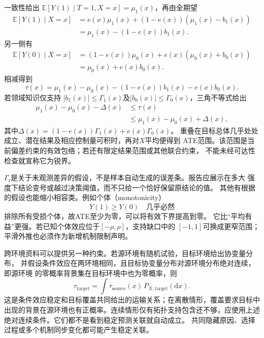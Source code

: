 一致性给出
\(\mathbb E[Y(1)\mid T=1,X=x]=\mu_1(x)\)，再由全期望
\[
  \begin{aligned}
    \mathbb E[Y(1)\mid X=x]
    &=e(x)\mu_1(x)+(1-e(x))(\mu_1(x)-b_1(x))\\
    &=\mu_1(x)-(1-e(x))b_1(x).
  \end{aligned}
\]
另一侧有
\[
  \begin{aligned}
    \mathbb E[Y(0)\mid X=x]
    &=(1-e(x))\mu_0(x)+e(x)(\mu_0(x)+b_0(x))\\
    &=\mu_0(x)+e(x)b_0(x).
  \end{aligned}
\]
相减得到
\begin{equation}
  \tau(x)=\mu_1(x)-\mu_0(x)
  -(1-e(x))b_1(x)-e(x)b_0(x).
  \label{eq:causal-selection-bias-function}
\end{equation}
若领域知识仅支持
\(|b_1(x)|\leq\Gamma_1(x)\)及\(|b_0(x)|\leq\Gamma_0(x)\)，三角不等式给出
\begin{equation}
  \begin{aligned}
    \mu_1(x)-\mu_0(x)-\Delta(x)
    &\leq\tau(x)\\
    &\leq\mu_1(x)-\mu_0(x)+\Delta(x),
  \end{aligned}
  \label{eq:causal-sensitivity-bounds}
\end{equation}
其中\(\Delta(x)=(1-e(x))\Gamma_1(x)+e(x)\Gamma_0(x)\)。
重叠在目标总体几乎处处成立、潜在结果及相应控制量可积时，再对\(X\)平均便得到
ATE范围。该范围是当前偏差约束的有效包络；若还有限定结果范围或其他联合约束，
不能未经可达性检查就宣称它为锐界。

\(\Gamma_t\)是关于未观测差异的假设，不是样本自动生成的误差条。报告应展示在多大
强度下结论变号或越过决策阈值，而不只给一个恰好保留原结论的值。
其他有根据的假设也能缩小相容类。例如个体（monotonicity）
\[
  Y(1)\geq Y(0)\quad\text{几乎必然}
\]
排除所有受损个体，故ATE至少为零，可以将有效下界提高到零。
它比“平均有益”更强。若已知个体效应位于\([-\rho,\rho]\)，支持缺口中的
\([-1,1]\)可换成更窄范围；平滑外推也必须作为新增机制限制声明。

跨环境资料可以提供另一种约束。若源环境有随机试验，目标环境给出协变量分布，
并假设条件效应在两环境相同，且目标协变量分布对源环境分布绝对连续，即源环境
的零概率背景集在目标环境中也为零概率，则
\[
  \tau_{\mathrm{target}}
  =\int\tau_{\mathrm{source}}(x)\,P_{X,\mathrm{target}}(\mathrm dx).
\]
这是条件效应稳定和目标覆盖共同给出的运输关系；在离散情形，覆盖要求目标中
出现的背景在源环境也有正概率。连续情形仅有拓扑支持包含还不够，应使用上述
绝对连续条件。它们都不是看到稳定预测关联就自动成立。
共同隐藏原因、选择过程或多个机制同步变化都可能产生稳定关联。

